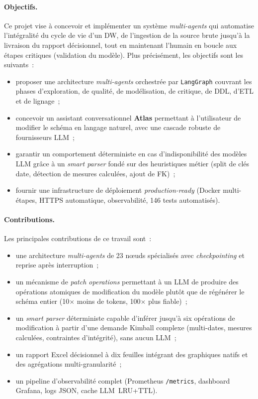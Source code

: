 \documentclass[12pt, a4paper]{report}
\begin{document}
\paragraph{Objectifs.}
Ce projet vise à concevoir et implémenter un système \emph{multi-agents}
qui automatise l'intégralité du cycle de vie d'un \ac{DW}, de l'ingestion
de la source brute jusqu'à la livraison du rapport décisionnel, tout en
maintenant l'humain en boucle aux étapes critiques (validation du modèle).
Plus précisément, les objectifs sont les suivants~:
\begin{itemize}
  \item proposer une architecture \emph{multi-agents} orchestrée par
        \texttt{LangGraph} couvrant les phases d'exploration, de qualité,
        de modélisation, de critique, de \ac{DDL}, d'ETL et de lignage~;
  \item concevoir un assistant conversationnel \textbf{Atlas} permettant
        à l'utilisateur de modifier le schéma en langage naturel, avec
        une cascade robuste de fournisseurs \ac{LLM}~;
  \item garantir un comportement déterministe en cas d'indisponibilité
        des modèles \ac{LLM} grâce à un \emph{smart parser} fondé sur des
        heuristiques métier (split de clés date, détection de mesures
        calculées, ajout de \ac{FK})~;
  \item fournir une infrastructure de déploiement \emph{production-ready}
        (Docker multi-étapes, \ac{HTTPS} automatique, observabilité,
        146 tests automatisés).
\end{itemize}

\paragraph{Contributions.}
Les principales contributions de ce travail sont~:
\begin{itemize}
  \item une architecture \emph{multi-agents} de 23 nœuds spécialisés
        avec \emph{checkpointing} et reprise après interruption~;
  \item un mécanisme de \emph{patch operations} permettant à un \ac{LLM}
        de produire des opérations atomiques de modification du modèle
        plutôt que de régénérer le schéma entier (10$\times$ moins de
        tokens, 100$\times$ plus fiable)~;
  \item un \emph{smart parser} déterministe capable d'inférer jusqu'à
        six opérations de modification à partir d'une demande Kimball
        complexe (multi-dates, mesures calculées, contraintes
        d'intégrité), sans aucun \ac{LLM}~;
  \item un rapport Excel décisionnel à dix feuilles intégrant des
        graphiques natifs et des agrégations multi-granularité~;
  \item un pipeline d'observabilité complet (Prometheus
        \texttt{/metrics}, dashboard Grafana, logs JSON, cache
        \ac{LLM}~LRU+TTL).
\end{itemize}
\end{document}

